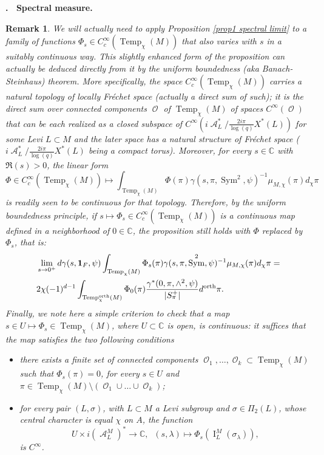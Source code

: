 \documentclass[12pt]{article}
\newenvironment{paragr}[1][]{\refstepcounter{subsubsection} \noindent \textbf{\thesubsubsection . \ #1}}{\medskip}
\newtheorem{rem}{Remark}[section]
\numberwithin{equation}{section}
\def\bC{\mathbb{C}}
\DeclareMathOperator{\orth}{orth}
\DeclareMathOperator{\Temp}{Temp}
\DeclareMathOperator{\cA}{\mathcal{A}}
\DeclareMathOperator{\cO}{\mathcal{O}}
\DeclareMathOperator{\Sym}{Sym}
\DeclareMathOperator{\rI}{\mathrm{I}}
\begin{document}
\begin{paragr}[Spectral measure.]
\begin{rem}\label{rmk}
We will actually need to apply Proposition \ref{prop1 spectral limit} to a family of functions $\Phi_s\in C_c^\infty(\Temp_\chi(M))$ that also varies with $s$ in a suitably continuous way. This slightly enhanced form of the proposition can actually be deduced directly from it by the uniform boundedness (aka Banach-Steinhaus) theorem. More specifically, the space $C_c^\infty(\Temp_\chi(M))$ carries a natural topology of locally Fr\'echet space (actually a direct sum of such); it is the direct sum over connected components $\cO$ of $\Temp_{\chi}(M)$ of spaces $C^\infty(\cO)$ that can be each realized as a closed subspace of $C^\infty(i\cA_L^*/\frac{2i\pi}{\log(q)} X^*(L))$ for some Levi $L\subset M$ and the later space has a natural structure of Fr\'echet space ($i\cA_L^*/\frac{2i\pi}{\log(q)} X^*(L)$ being a compact torus). Moreover, for every $s\in \bC$ with $\Re(s)>0$, the linear form
$$\Phi\in C_c^\infty(\Temp_{\chi}(M))\mapsto \int_{\Temp_\chi(M)} \Phi(\pi) \gamma(s,\pi,\Sym^2,\psi)^{-1} \mu_{M,\chi}(\pi)d_\chi\pi$$
is readily seen to be continuous for that topology. Therefore, by the uniform boundedness principle, if $s\mapsto \Phi_s\in C_c^\infty(\Temp_\chi(M))$ is a continuous map defined in a neighborhood of $0\in \bC$, the proposition still holds with $\Phi$ replaced by $\Phi_s$, that is:
\[\begin{aligned}
	\displaystyle & \lim\limits_{s\to 0^+} d\gamma(s,\mathbf{1}_F,\psi)\int_{\Temp_\chi(M)} \Phi_s(\pi) \gamma(s,\pi,\Sym^2,\psi)^{-1} \mu_{M,\chi}(\pi)d_\chi\pi= \\
	& 2\chi(-1)^{d-1}\int_{\Temp^{\orth}_\chi(M)} \Phi_0(\pi) \frac{\gamma^*(0,\pi,\wedge^2,\psi)}{\lvert S_\pi^{+}\rvert} d^{\orth}\pi.
\end{aligned}\]
Finally, we note here a simple criterion to check that a map $s\in U\mapsto \Phi_s\in \Temp_\chi(M)$, where $U\subset \bC$ is open, is continuous: it suffices that the map satisfies the two following conditions
\begin{itemize}
	\item there exists a finite set of connected components $\cO_1,\ldots,\cO_k\subset \Temp_\chi(M)$ such that $\Phi_s(\pi)=0$, for every $s\in U$ and $\pi\in \Temp_\chi(M)\setminus (\cO_1\cup\ldots\cup \cO_k)$;
	
	\item for every pair $(L,\sigma)$, with $L\subset M$ a Levi subgroup and $\sigma\in \Pi_2(L)$, whose central character is equal $\chi$ on $A$, the function
	$$\displaystyle U\times i(\cA_L^M)^*\to \bC,\;\; (s,\lambda)\mapsto \Phi_s(\rI_L^M(\sigma_\lambda)),$$
	is $C^\infty$.
\end{itemize} 
\end{rem}
\end{paragr}
\end{document}
